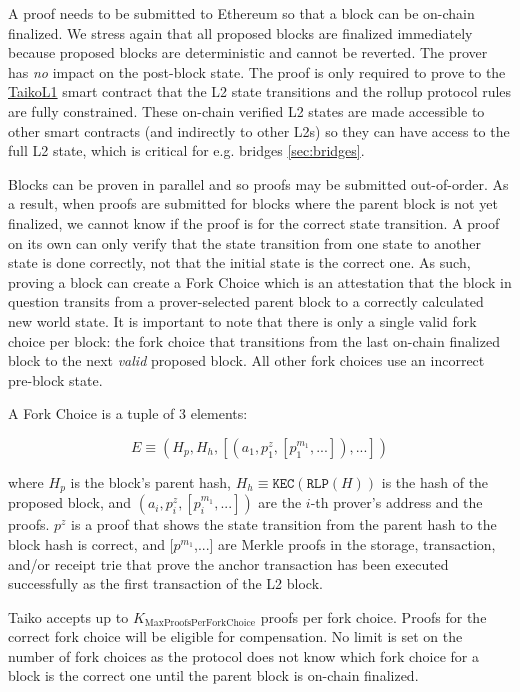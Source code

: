\documentclass[9pt,oneside]{amsart}
\begin{document}
\begin{multicols}{2}
A proof needs to be submitted to Ethereum so that a block can be on-chain finalized. We stress again that all proposed blocks are finalized immediately because proposed blocks are deterministic and cannot be reverted. The prover has \emph{no} impact on the post-block state. The proof is only required to prove to the \underline{TaikoL1} smart contract that the L2 state transitions and the rollup protocol rules are fully constrained. These on-chain verified L2 states are made accessible to other smart contracts (and indirectly to other L2s) so they can have access to the full L2 state, which is critical for e.g. bridges \ref{sec:bridges}.

Blocks can be proven in parallel and so proofs may be submitted out-of-order. As a result, when proofs are submitted for blocks where the parent block is not yet finalized, we cannot know if the proof is for the correct state transition. A proof on its own can only verify that the state transition from one state to another state is done correctly, not that the initial state is the correct one. As such, proving a block can create a Fork Choice which is an attestation that the block in question transits from a prover-selected parent block to a correctly calculated new world state. It is important to note that there is only a single valid fork choice per block: the fork choice that transitions from the last on-chain finalized block to the next \emph{valid} proposed block. All other fork choices use an incorrect pre-block state.

A Fork Choice is a tuple of 3 elements:

\begin{equation}
E \equiv (H_p, H_h, [(a_1, p^{z}_1, [p^{m_1}_1,...]),...])
\end{equation}

where $H_p$ is the block's parent hash, $H_h \equiv \texttt{KEC}(\texttt{RLP}(H))$ is the hash of the proposed block, and $(a_i, p^{z}_i, [p^{m_1}_i,...])$ are the $i$-th prover's address and the proofs. $p^{z}$ is a proof that shows the state transition from the parent hash to the block hash is correct, and [$p^{m_1}$,...] are Merkle proofs in the storage, transaction, and/or receipt trie that prove the anchor transaction has been executed successfully as the first transaction of the L2 block.

Taiko accepts up to $K_{\mathrm{MaxProofsPerForkChoice}}$ proofs per fork choice. Proofs for the correct fork choice will be eligible for compensation. No limit is set on the number of fork choices as the protocol does not know which fork choice for a block is the correct one until the parent block is on-chain finalized.


\end{multicols}
\end{document}

